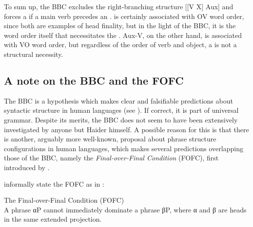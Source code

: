 \documentclass[output=paper, colorlinks, citecolor=brown]{langscibook}
\begin{document}
\ea
\label{ex:sangfelt:7}
\ex{[\textsubscript{VP1} Aux [\textsubscript{VP2} X V]\label{ex:sangfelt:7b}}
\z 
\z 

To sum up, the BBC excludes the right-branching structure [[V X] Aux] and forces a  if a main verb precedes an .  is certainly associated with OV word order, since both are examples of head finality, but in the light of the BBC, it is the  word order itself that necessitates the . Aux-V, on the other hand, is associated with VO word order, but regardless of the order of verb and object, a  is not a structural necessity.

\subsection{A note on the BBC and the FOFC}\label{sec:sangfelt:2.2}

The BBC is a hypothesis which makes clear and falsifiable predictions about syntactic structure in human languages (see \citealt{Haider2013}). If correct, it is part of universal grammar. Despite its merits, the BBC does not seem to have been extensively investigated by anyone but Haider himself. A possible reason for this is that there is another, arguably more well-known, proposal about phrase structure configurations in human languages, which makes several predictions overlapping those of the BBC, namely the \textit{Final-over-Final Condition} (FOFC), first introduced by \citet{Holmberg2000}.


\citet[171]{BiberauerEtAl2014} informally state the FOFC as in : 

\ea The Final-over-Final Condition (FOFC)\label{ex:sangfelt:8}\\
A  phrase αP cannot immediately dominate a  phrase βP, where
α and β are heads in the same extended projection.
\z 
\end{document}
